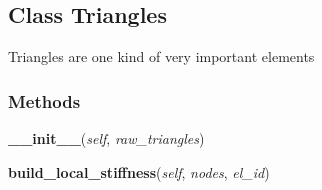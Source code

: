 

\subsection{Class Triangles}

    \label{Classes:Triangles}
Triangles are one kind of very important elements



  \subsubsection{Methods}

    \label{Classes:Triangles:__init__}

    \vspace{0.5ex}

\hspace{.8\funcindent}\begin{boxedminipage}{\funcwidth}

    \raggedright \textbf{\_\_init\_\_}(\textit{self}, \textit{raw\_triangles})

\setlength{\parskip}{2ex}
\setlength{\parskip}{1ex}
    \end{boxedminipage}

    \label{Classes:Triangles:build_local_stiffness}

    \vspace{0.5ex}

\hspace{.8\funcindent}\begin{boxedminipage}{\funcwidth}

    \raggedright \textbf{build\_local\_stiffness}(\textit{self}, \textit{nodes}, \textit{el\_id})

\setlength{\parskip}{2ex}
\setlength{\parskip}{1ex}
    \end{boxedminipage}

